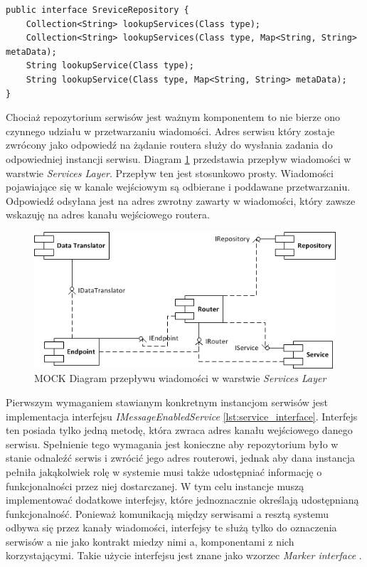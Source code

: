 \begin{center}
\begin{lstlisting}
public interface SreviceRepository {
	Collection<String> lookupServices(Class type);
	Collection<String> lookupServices(Class type, Map<String, String> metaData);
	String lookupService(Class type);
	String lookupService(Class type, Map<String, String> metaData);
}
\end{lstlisting}
\end{center}

Chociaż repozytorium serwisów jest ważnym komponentem to nie bierze ono czynnego udziału w przetwarzaniu wiadomości. Adres serwisu który zostaje zwrócony jako odpowiedź na żądanie routera służy do wysłania zadania do odpowiedniej instancji serwisu. Diagram \ref{fig:services_layer_project} przedstawia przepływ wiadomości w warstwie \textit{Services Layer}. Przepływ ten jest stosunkowo prosty. Wiadomości pojawiające się w kanale wejściowym są odbierane i poddawane przetwarzaniu. Odpowiedź odsyłana jest na adres zwrotny zawarty w wiadomości, który zawsze wskazuję na adres kanału wejściowego routera. 

\begin{figure}[!h]
	\centering
	\includegraphics[scale=1.0]{component_uml.png}
	\caption{MOCK Diagram przepływu wiadomości w warstwie \textit{Services Layer}}\label{fig:services_layer_project}
\end{figure}

Pierwszym wymaganiem stawianym konkretnym instancjom serwisów jest implementacja interfejsu \textit{IMessageEnabledService} \ref{lst:service_interface}. Interfejs ten posiada tylko jedną metodę, która zwraca adres kanału wejściowego danego serwisu. Spełnienie tego wymagania jest konieczne aby repozytorium było w stanie odnaleźć serwis i zwrócić jego adres routerowi, jednak aby dana instancja pełniła jakąkolwiek rolę w systemie musi także udostępniać informację o funkcjonalności przez niej dostarczanej. W tym celu instancje muszą implementować dodatkowe interfejsy, które jednoznacznie określają udostępnianą funkcjonalność. Ponieważ komunikacją między serwisami a resztą systemu odbywa się przez kanały wiadomości, interfejsy te służą tylko do oznaczenia serwisów a nie jako kontrakt miedzy nimi a, komponentami z nich korzystającymi. Takie użycie interfejsu jest znane jako wzorzec \textit{Marker interface} \cite{bloch2008}.

